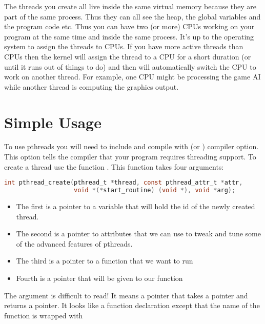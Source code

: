 The threads you create all live inside the same virtual memory because they are part of the same process. Thus they can all see the heap, the global variables and the program code etc. Thus you can have two (or more) CPUs working on your program at the same time and inside the same process. It's up to the operating system to assign the threads to CPUs. If you have more active threads than CPUs then the kernel will assign the thread to a CPU for a short duration (or until it runs out of things to do) and then will automatically switch the CPU to work on another thread. For example, one CPU might be processing the game AI while another thread is computing the graphics output.

\section{Simple Usage}\label{simple-usage}

To use pthreads you will need to include  and compile with  (or ) compiler option. This option tells the compiler that your program requires threading support. To create a thread use the function . This function takes four arguments:

\begin{lstlisting}[language=C]
int pthread_create(pthread_t *thread, const pthread_attr_t *attr,
                   void *(*start_routine) (void *), void *arg);
\end{lstlisting}

\begin{itemize}
\tightlist
\item
  The first is a pointer to a variable that will hold the id of the newly created thread.
\item
  The second is a pointer to attributes that we can use to tweak and tune some of the advanced features of pthreads.
\item
  The third is a pointer to a function that we want to run
\item
  Fourth is a pointer that will be given to our function
\end{itemize}

The argument  is difficult to read! It means a pointer that takes a  pointer and returns a  pointer. It looks like a function declaration except that the name of the function is wrapped with 

